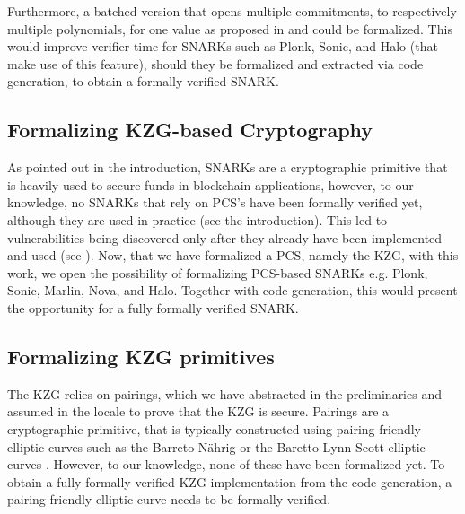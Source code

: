 Furthermore, a batched version that opens multiple commitments, to respectively multiple polynomials, for one value as proposed in \parencite{plonk} and \parencite{sonic} could be formalized. This would improve verifier time for SNARKs such as Plonk, Sonic, and Halo (that make use of this feature), should they be formalized and extracted via code generation, to obtain a formally verified SNARK.

\subsection*{Formalizing KZG-based Cryptography}
As pointed out in the introduction, SNARKs are a cryptographic primitive that is heavily used to secure funds in blockchain applications, however, to our knowledge, no SNARKs that rely on PCS's have been formally verified yet, although they are used in practice (see the introduction). This led to vulnerabilities being discovered only after they already have been implemented and used (see \parencite{FHBulletproofs}). Now, that we have formalized a PCS, namely the KZG, with this work, we open the possibility of formalizing PCS-based SNARKs e.g. Plonk, Sonic, Marlin, Nova, and Halo. Together with code generation, this would present the opportunity for a fully formally verified SNARK. 

\subsection*{Formalizing KZG primitives}
The KZG relies on pairings, which we have abstracted in the preliminaries and assumed in the locale to prove that the KZG is secure. Pairings are a cryptographic primitive, that is typically constructed using pairing-friendly elliptic curves such as the Barreto-Nährig\parencite{BN-EC} or the Baretto-Lynn-Scott\parencite{BLS-EC} elliptic curves \parencite{boneh_shoup}. However, to our knowledge, none of these have been formalized yet. To obtain a fully formally verified KZG implementation from the code generation, a pairing-friendly elliptic curve needs to be formally verified.